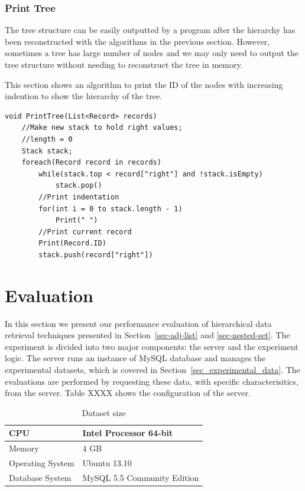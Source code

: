 \subsubsection{Print Tree}

The tree structure can be easily outputted by a program after the hierarchy has been reconstructed with the algorithms in the previous section. However, sometimes a tree has large number of nodes and we may only need to output the tree structure without needing to reconstruct the tree in memory.

This section shows an algorithm to print the ID of the nodes with increasing indention to show the hierarchy of the tree.

\begin{lstlisting}[caption={Tree reconstruction using Left and Right value},label=ns_print_tree]
void PrintTree(List<Record> records)
	//Make new stack to hold right values; 
	//length = 0
	Stack stack;
	foreach(Record record in records)
		while(stack.top < record["right"] and !stack.isEmpty)
			stack.pop()
		//Print indentation
		for(int i = 0 to stack.length - 1) 
			Print(" ")
		//Print current record
		Print(Record.ID)
		stack.push(record["right"])
\end{lstlisting}

\section{Evaluation}

In this section we present our performance evaluation of hierarchical data retrieval techniques presented in Section~\ref{sec-adj-list} and \ref{sec-nested-set}. The experiment is divided into two major components: the server and the experiment logic. The server runs an instance of MySQL database and manages the experimental datasets, which is covered in Section~\ref{sec_experimental_data}. The evaluations are performed by requesting these data, with specific characterisitics, from the server. Table XXXX shows the configuration of the server.

\begin{table}[h]
\centering
\begin{tabular}{|l|l|}
\hline
CPU & Intel Processor 64-bit \\ \hline
Memory & 4 GB \\ \hline
Operating System & Ubuntu 13.10 \\ \hline
Database System & MySQL 5.5 Community Edition \\ \hline 
\end{tabular}
\caption{Dataset size\label{table:tbl_server_config}}
\end{table}

